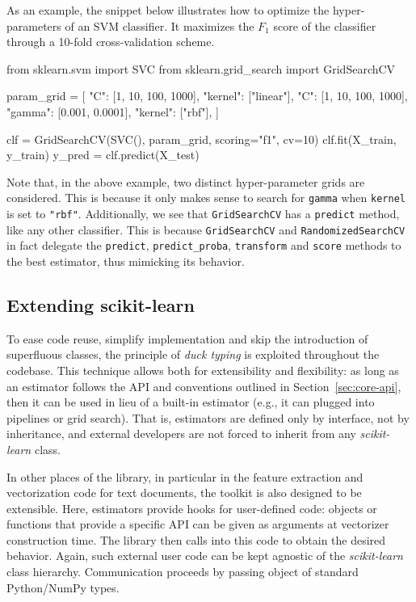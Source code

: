 \documentclass{llncs}
\newcommand{\sklearn}{\textit{scikit-learn}\xspace}
\begin{document}
As an example, the snippet below illustrates how to optimize the
hyper-parameters of an SVM classifier. It maximizes the $F_1$ score of the
classifier through a 10-fold cross-validation scheme.
\begin{pythoncode}
from sklearn.svm import SVC
from sklearn.grid_search import GridSearchCV

param_grid = [
  {"C": [1, 10, 100, 1000], "kernel": ["linear"]},
  {"C": [1, 10, 100, 1000], "gamma": [0.001, 0.0001],
   "kernel": ["rbf"]},
]

clf = GridSearchCV(SVC(), param_grid, scoring="f1", cv=10)
clf.fit(X_train, y_train)
y_pred = clf.predict(X_test)
\end{pythoncode}
Note that, in the above example, two distinct hyper-parameter grids are
considered. This is because it only makes sense to search for \texttt{gamma}
when \texttt{kernel} is set to \texttt{"rbf"}.  Additionally, we see that
\texttt{GridSearchCV} has a \texttt{predict} method, like any other classifier.
This is because \texttt{GridSearchCV} and \texttt{RandomizedSearchCV} in fact
delegate the \texttt{predict}, \texttt{predict\_proba}, \texttt{transform} and
\texttt{score} methods to the best estimator, thus mimicking its behavior.

\subsection{Extending scikit-learn}

To ease code reuse, simplify implementation and skip the introduction of
superfluous classes, the principle of \textit{duck typing} is exploited
throughout the codebase. This technique allows both for extensibility and
flexibility: as long as an estimator follows the API and conventions
outlined in Section~\ref{sec:core-api}, then it can be used in lieu of a
built-in estimator (e.g., it can plugged into pipelines or grid search).
That is, estimators are defined only by interface, not by inheritance,
and external developers are not forced to inherit from any \sklearn class.

In other places of the library, in particular in the feature extraction and
vectorization code for text documents, the toolkit is also designed to be
extensible. Here, estimators provide hooks for user-defined code: objects or
functions that provide a specific API can be given as arguments at vectorizer
construction time. The library then calls into this code to obtain the desired
behavior. Again, such external user code can be kept agnostic of the \sklearn
class hierarchy.
Communication proceeds by passing object of standard Python/NumPy types.
\end{document}
